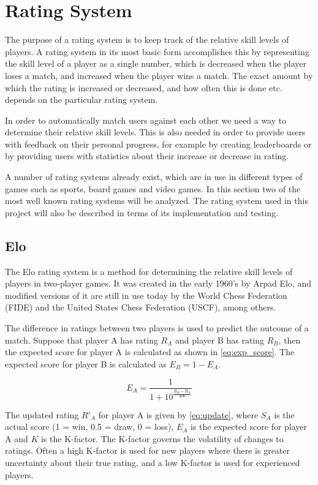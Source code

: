 \section{Rating System}
The purpose of a rating system is to keep track of the relative skill levels of players.
A rating system in its most basic form accomplishes this by representing the skill level of a player as a single number, which is decreased when the player loses a match, and increased when the player wins a match.
The exact amount by which the rating is increased or decreased, and how often this is done etc. depends on the particular rating system.

In order to automatically match users against each other we need a way to determine their relative skill levels.
This is also needed in order to provide users with feedback on their personal progress, for example by creating leaderboards or by providing users with statistics about their increase or decrease in rating.

A number of rating systems already exist, which are in use in different types of games such as sports, board games and video games.
In this section two of the most well known rating systems will be analyzed.
The rating system used in this project will also be described in terms of its implementation and testing.

\subsection{Elo}
\label{sec:elo}
The Elo rating system is a method for determining the relative skill levels of players in two-player games.
It was created in the early 1960's by Arpad Elo, and modified versions of it are still in use today by the World Chess Federation (FIDE) and the United States Chess Federation (USCF), among others.

The difference in ratings between two players is used to predict the outcome of a match.
Suppose that player A has rating $R_A$ and player B has rating $R_B$, then the expected score for player A is calculated as shown in \autoref{eq:exp_score}.
The expected score for player B is calculated as $E_B = 1 - E_A$.

\begin{equation} \label{eq:exp_score}
E_A = \frac{1}{1 + 10^\frac{R_B - R_A}{400}}
\end{equation}

The updated rating $R'_A$ for player A is given by \autoref{eq:update}, where $S_A$ is the actual score (1 = win, 0.5 = draw, 0 = loss), $E_A$ is the expected score for player A and $K$ is the K-factor.
The K-factor governs the volatility of changes to ratings.
Often a high K-factor is used for new players where there is greater uncertainty about their true rating, and a low K-factor is used for experienced players.

